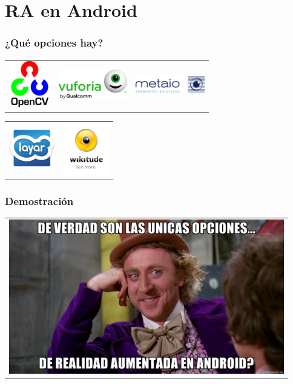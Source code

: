 \section{RA en Android}
\frame
{
\frametitle{¿Qué opciones hay?}
{\setlength{\arrayrulewidth}{0mm}
\begin{table}[ht]
  \centering
  \begin{tabular}{| m{3cm} | m{4cm} | m{4cm} |}
  \hline
  \includegraphics[height=2cm, width=1.8cm]{imgs/opencv.png} & 
     \hspace{2cm}\includegraphics[width=3cm]{imgs/vuforia.png} & 
     \hspace{2cm}\includegraphics[width=3cm]{imgs/metaio.jpg}
  \end{tabular}
\end{table}
}

{\setlength{\arrayrulewidth}{0mm}
\begin{table}[ht]
  \centering
  \begin{tabular}{| m{4cm} | m{4cm} |}
  \hline
  \includegraphics[width=2cm]{imgs/layar.jpg}& \includegraphics[width=2cm]{imgs/wikitude.png}
  \end{tabular}
\end{table}
}
}

\frame
{
\frametitle{Demostración}
{
\begin{table}[ht]
  \centering
  \begin{tabular}{c}
    \includegraphics[width=12cm]{imgs/memeopciones.jpg}
  \end{tabular}
\end{table}
}
}





